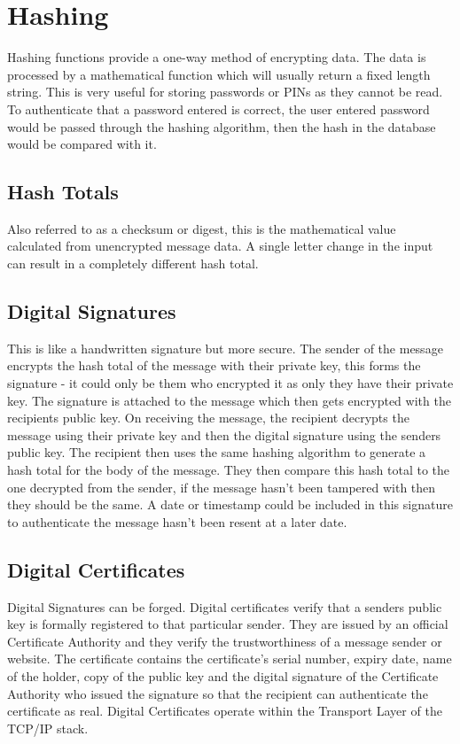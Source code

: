 \documentclass[a4paper,11pt, twocolumn]{article}
\begin{document}
\section{Hashing}
Hashing functions provide a one-way method of encrypting data. The data is processed by a mathematical function which will usually return a fixed length string. This is very useful for storing passwords or PINs as they cannot be read. To authenticate that a password entered is correct, the user entered password would be passed through the hashing algorithm, then the hash in the database would be compared with it.
\subsection{Hash Totals}
Also referred to as a checksum or digest, this is the mathematical value calculated from unencrypted message data. A single letter change in the input can result in a completely different hash total.
\subsection{Digital Signatures}
This is like a handwritten signature but more secure. The sender of the message encrypts the hash total of the message with their private key, this forms the signature - it could only be them who encrypted it as only they have their private key. The signature is attached to the message which then gets encrypted with the recipients public key. On receiving the message, the recipient decrypts the message using their private key and then the digital signature using the senders public key. The recipient then uses the same hashing algorithm to generate a hash total for the body of the message. They then compare this hash total to the one decrypted from the sender, if the message hasn't been tampered with then they should be the same. A date or timestamp could be included in this signature to authenticate the message hasn't been resent at a later date.
\subsection{Digital Certificates}
Digital Signatures can be forged. Digital certificates verify that a senders public key is formally registered to that particular sender. They are issued by an official Certificate Authority and they verify the trustworthiness of a message sender or website. The certificate contains the certificate's serial number, expiry date, name of the holder, copy of the public key and the digital signature of the Certificate Authority who issued the signature so that the recipient can authenticate the certificate as real. Digital Certificates operate within the Transport Layer of the TCP/IP stack.
\end{document}

